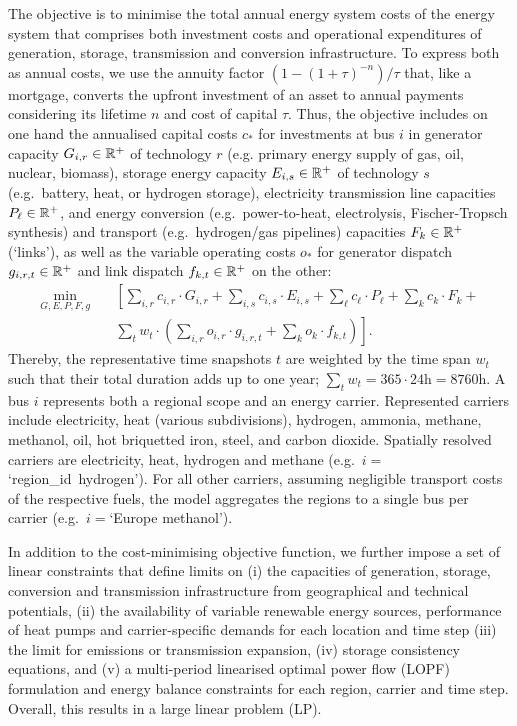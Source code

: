 The objective is to minimise the total annual energy system costs of the energy
system that comprises both investment costs and operational expenditures of
generation, storage, transmission and conversion infrastructure. To express both
as annual costs, we use the annuity factor $(1-(1+\tau)^{-n}) / \tau$ that, like
a mortgage, converts the upfront investment of an asset to annual payments
considering its lifetime $n$ and cost of capital $\tau$. Thus, the objective
includes on one hand the annualised capital costs $c_*$ for investments at bus
$i$ in generator capacity $G_{i,r}\in\mathbb{R}^+$ of technology $r$ (e.g. primary
energy supply of gas, oil, nuclear, biomass), storage energy capacity
$E_{i,s}\in\mathbb{R}^+$ of technology $s$ (e.g.~battery, heat, or hydrogen storage),
electricity transmission line capacities $P_{\ell}\in\mathbb{R}^+$, and energy
conversion (e.g.~power-to-heat, electrolysis, Fischer-Tropsch synthesis) and
transport (e.g.~hydrogen/gas pipelines) capacities $F_k\in\mathbb{R}^+$ (`links'), as
well as the variable operating costs $o_*$ for generator dispatch
$g_{i,r,t}\in\mathbb{R}^+$ and link dispatch $f_{k,t}\in\mathbb{R}^+$ on the other:
\begin{align}
  \label{eq:objective}
  \min_{G,E,P,F,g} \quad &\left[\sum_{i,r} c_{i,r}\cdot G_{i,r} + \sum_{i,s} c_{i,s}\cdot E_{i,s} + \sum_{\ell}c_{\ell}\cdot P_{\ell}+ \sum_{k}c_{k}\cdot F_k +\right. \\
  & \left.  \sum_{t} w_t \cdot \left( \sum_{i,r} o_{i,r} \cdot g_{i,r,t} + \sum_k o_k \cdot f_{k,t} \right) \right].
\end{align}
Thereby, the representative time snapshots $t$ are weighted by the time span
$w_t$ such that their total duration adds up to one year; \mbox{$\sum_{t}
w_t=365\cdot 24\text{h}=8760\text{h}$}. A bus $i$ represents both a regional
scope and an energy carrier. Represented carriers include electricity, heat
(various subdivisions), hydrogen, ammonia, methane, methanol, oil, hot
briquetted iron, steel, and carbon dioxide. Spatially resolved carriers are
electricity, heat, hydrogen and methane (e.g.~\mbox{$i=$`region\_id hydrogen'}).
For all other carriers, assuming negligible transport costs of the respective
fuels, the model aggregates the regions to a single bus per carrier
(e.g.~$i=$`Europe methanol').



In addition to the cost-minimising objective function, we further impose a set
of linear constraints that define limits on (i) the capacities of generation,
storage, conversion and transmission infrastructure from geographical and
technical potentials, (ii) the availability of variable renewable energy
sources, performance of heat pumps and carrier-specific demands for each
location and time step (iii) the limit for \co emissions or transmission
expansion, (iv) storage consistency equations, and (v) a multi-period linearised
optimal power flow (LOPF) formulation and energy balance constraints for each
region, carrier and time step. Overall, this results in a large linear problem
(LP).

